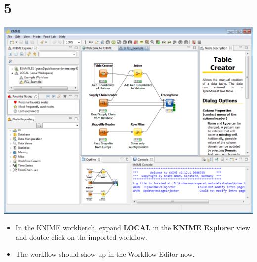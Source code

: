 \documentclass{beamer}
\begin{document}
\section{5}
\begin{frame}
	\begin{center}
  		\includegraphics[height=0.6\textheight]{5.png}
	\end{center}
	\begin{itemize}
		\item In the KNIME workbench, expand \textbf{LOCAL} in the \textbf{KNIME Explorer} view and double click on the imported workflow.
		\item The workflow should show up in the Workflow Editor now.
	\end{itemize}
\end{frame}
\end{document}
